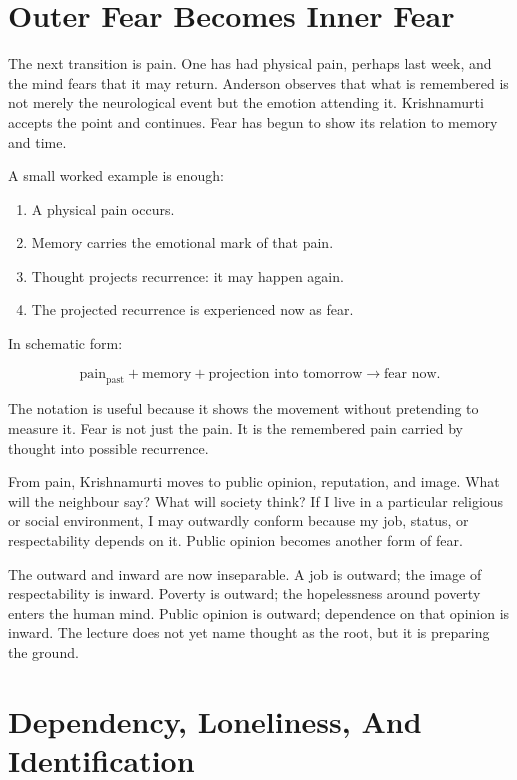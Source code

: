 \section{Outer Fear Becomes Inner Fear}

The next transition is pain. One has had physical pain, perhaps last week, and the mind fears that it may return. Anderson observes that what is remembered is not merely the neurological event but the emotion attending it. Krishnamurti accepts the point and continues. Fear has begun to show its relation to memory and time.

A small worked example is enough:

\begin{enumerate}
\item A physical pain occurs.
\item Memory carries the emotional mark of that pain.
\item Thought projects recurrence: it may happen again.
\item The projected recurrence is experienced now as fear.
\end{enumerate}

In schematic form:

\begin{equation}
\text{pain}_{\mathrm{past}} + \text{memory} + \text{projection into tomorrow}
\longrightarrow
\text{fear now}.
\end{equation}

The notation is useful because it shows the movement without pretending to measure it. Fear is not just the pain. It is the remembered pain carried by thought into possible recurrence.

From pain, Krishnamurti moves to public opinion, reputation, and image. What will the neighbour say? What will society think? If I live in a particular religious or social environment, I may outwardly conform because my job, status, or respectability depends on it. Public opinion becomes another form of fear.

The outward and inward are now inseparable. A job is outward; the image of respectability is inward. Poverty is outward; the hopelessness around poverty enters the human mind. Public opinion is outward; dependence on that opinion is inward. The lecture does not yet name thought as the root, but it is preparing the ground.

\section{Dependency, Loneliness, And Identification}

